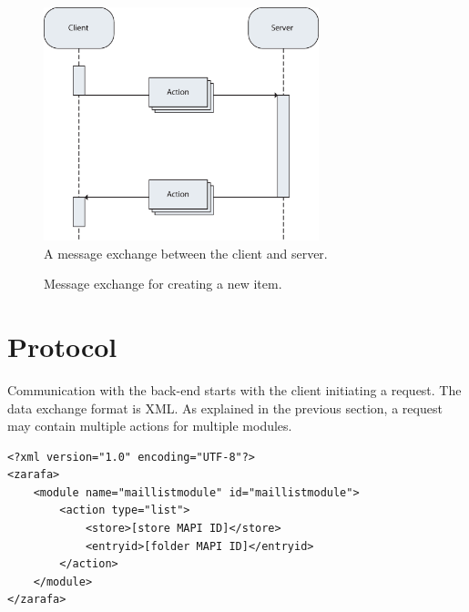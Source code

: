 \begin{figure}[b!]
\centering
\includegraphics[width=8cm]{figures/message-exchange.eps}
\caption{A message exchange between the client and server.}
\label{figure:messageexchange}
\end{figure}

\begin{figure}
\centering
{}
\caption{Message exchange for creating a new item.}
\label{figure:saveitem}
\end{figure}

\section{Protocol}
\label{section:protocol}

Communication with the back-end starts with the client initiating a request. The data exchange format is
XML. As explained in the previous section, a request may contain multiple actions for multiple modules.

\begin{lstlisting}[caption={Client server communication: client request}, label=listing:clientrequest]
<?xml version="1.0" encoding="UTF-8"?>
<zarafa>
	<module name="maillistmodule" id="maillistmodule">
		<action type="list">
			<store>[store MAPI ID]</store>
			<entryid>[folder MAPI ID]</entryid>
		</action>
	</module>
</zarafa>
\end{lstlisting}

